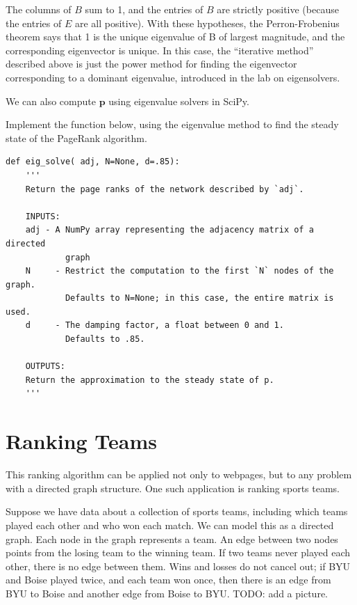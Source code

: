 The columns of $B$ sum to 1, and the entries of $B$ are strictly positive (because the entries of $E$ are all positive).
With these hypotheses, the Perron-Frobenius theorem says that 1 is the unique eigenvalue of B of largest magnitude, and the corresponding eigenvector is unique.
In this case, the ``iterative method'' described above is just the power method for finding the eigenvector corresponding to a dominant eigenvalue, introduced in the lab on eigensolvers. %

We can also compute $\mathbf{p}$ using eigenvalue solvers in SciPy.

\begin{problem}
Implement the function below, using the eigenvalue method to find the steady state of the PageRank algorithm.
\begin{lstlisting}
def eig_solve( adj, N=None, d=.85):
    '''
    Return the page ranks of the network described by `adj`.

    INPUTS:
    adj - A NumPy array representing the adjacency matrix of a directed
            graph
    N     - Restrict the computation to the first `N` nodes of the graph.
            Defaults to N=None; in this case, the entire matrix is used.
    d     - The damping factor, a float between 0 and 1.
            Defaults to .85.

    OUTPUTS:
    Return the approximation to the steady state of p.
    '''
\end{lstlisting}
\end{problem}

\section*{Ranking Teams}
This ranking algorithm can be applied not only to webpages, but to any problem with a directed graph structure.
One such application is ranking sports teams.

Suppose we have data about a collection of sports teams, including which teams played each other and who won each match.
We can model this as a directed graph. Each node in the graph represents a team.
An edge between two nodes points from the losing team to the winning team.
If two teams never played each other, there is no edge between them.
Wins and losses do not cancel out; if BYU and Boise played twice, and each team won once, then there is an edge from BYU to Boise and another edge from Boise to BYU. TODO: add a picture.

